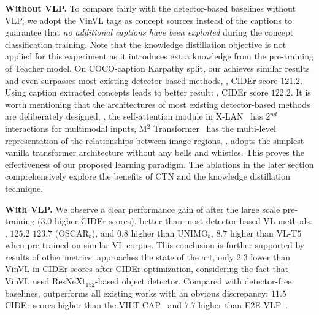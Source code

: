 \noindent \textbf{Without VLP.} To compare fairly with the detector-based baselines without VLP,  we adopt the VinVL tags as concept sources instead of the captions to guarantee that \emph{no additional captions have been exploited} during the concept classification training. Note that the knowledge distillation objective is not applied for this experiment as it introduces extra knowledge from the pre-training of Teacher model.
On COCO-caption Karpathy split, our \vitcap achieves similar results and even surpasses most existing detector-based methods, \ie, CIDEr score $121.2$. Using caption extracted concepts leads to better result: \ie, CIDEr score $122.2$.  It is worth mentioning that the architectures of most existing detector-based methods are deliberately designed, \eg, the self-attention module in X-LAN~\citep{pan2020x} has 2$^{nd}$ interactions for multimodal inputs, M$^{2}$ Transformer~\citep{cornia2020meshed} has the multi-level representation of the relationships between image regions, \etc. \vitcap adopts the simplest vanilla transformer architecture without any bells and whistles. This proves the effectiveness of our proposed learning paradigm. 
The ablations in the later section comprehensively explore the benefits of CTN and the knowledge distillation technique. 


\noindent \textbf{With VLP.}
We observe a clear performance gain of \vitcap after the large scale pre-training ($3.0$ higher CIDEr scores), better than most detector-based VL methods: \eg, $125.2$ \vs $123.7$ (OSCAR$_{b}$), and $0.8$ higher than UNIMO$_{b}$, $8.7$ higher than VL-T$5$ when pre-trained on similar VL corpus. This conclusion is further supported by results of other metrics. \vitcap approaches the state of the art, only $2.3$ lower than VinVL in CIDEr scores after CIDEr optimization, considering the fact that VinVL used ResNeXt$_{152}$-based object detector.
Compared with detector-free baselines, \vitcap outperforms all existing works with an obvious discrepancy: $11.5$ CIDEr scores higher than the VILT-CAP~\citep{kim2021vilt} and $7.7$ higher than E2E-VLP~\citep{xu2021e2e}. 

